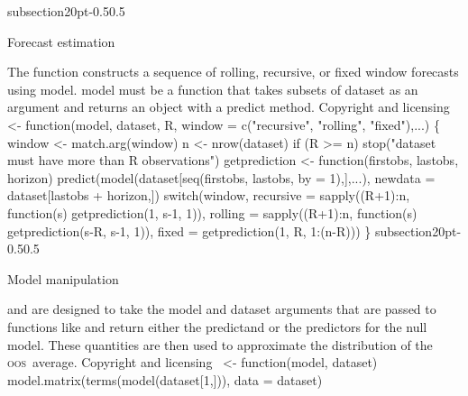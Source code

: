 \documentclass[10pt]{article}%
\makeatletter
\newcommand{\oos}{\textsc{oos}}
\renewcommand\subsection{\@startsection%
{subsection}{2}{0pt}{-0.5\baselineskip}{0.5\baselineskip}%
{\normalfont\normalsize\bfseries\small\raggedright}}
\makeatother
\begin{document}
\subsection{Forecast estimation}

The {\Tt{}\nwendquote} function constructs a sequence of rolling,
recursive, or fixed window forecasts using {\Tt{}model\nwendquote}.  {\Tt{}model\nwendquote} must
be a function that takes subsets of {\Tt{}dataset\nwendquote} as an argument and
returns an object with a {\Tt{}predict\nwendquote} method.
\nwenddocs{}\endmoddef\nwstartdeflinemarkup\nwenddeflinemarkup
\LA{}Copyright and licensing~{\nwtagstyle{}}\RA{}
 <- function(model, dataset, R,
                         window = c("recursive", "rolling", "fixed"),...) \{
  window <- match.arg(window)
  n <- nrow(dataset)
  if (R >= n) stop("dataset must have more than R observations")
  getprediction <- function(firstobs, lastobs, horizon)
    predict(model(dataset[seq(firstobs, lastobs, by = 1),],...),
            newdata = dataset[lastobs + horizon,])
  switch(window,
         recursive = sapply((R+1):n, function(s) getprediction(1, s-1, 1)),
         rolling   = sapply((R+1):n, function(s) getprediction(s-R, s-1, 1)),
         fixed     = getprediction(1, R, 1:(n-R)))
\}                 
\eatline
{}\nwendcode{}\nwdocspar
\subsection{Model manipulation}

{\Tt{}\nwendquote} and {\Tt{}\nwendquote} are designed to take the
{\Tt{}model\nwendquote} and {\Tt{}dataset\nwendquote} arguments that are passed to functions like
{\Tt{}\nwendquote} and return either the predictand or the predictors
for the {\Tt{}null\nwendquote} model.  These quantities are then used to approximate
the distribution of the \oos\ average.
\nwenddocs{}\endmoddef\nwstartdeflinemarkup\nwenddeflinemarkup
\LA{}Copyright and licensing~{\nwtagstyle{}}\RA{}
 <- function(model, dataset)
  model.matrix(terms(model(dataset[1,])), data = dataset)
\end{document}
